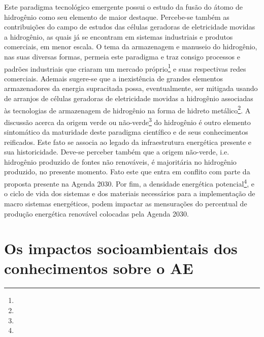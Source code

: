 \documentclass[
  12pt,       %
  openright,      %
  twoside,      %
  a4paper,      %
  english,      %
  french,       %
  spanish,      %
  brazil        %
  ]{abntex2}
\begin{document}
Este paradigma tecnológico emergente possui o estudo da fusão do átomo de hidrogênio como seu elemento de maior destaque. Percebe-se também as contribuições do campo de estudos das células geradoras de eletricidade movidas a hidrogênio, as quais já se encontram em sistemas industriais e produtos comerciais, em menor escala. O tema da armazenagem e manuseio do hidrogênio, nas suas diversas formas, permeia este paradigma e traz consigo processos e padrões industriais que criaram um mercado próprio\footnote{} e suas respectivas redes comerciais. Ademais sugere-se que a inexistência de grandes elementos armazenadores da energia supracitada possa, eventualmente, ser mitigada usando de arranjos de células geradoras de eletricidade movidas a hidrogênio associadas às tecnologias de armazenagem de hidrogênio na forma de hidreto metálico\footnote{}. A discussão acerca da origem verde ou não-verde\footnote{} do hidrogênio é outro elemento sintomático da maturidade deste paradigma científico e de seus conhecimentos reificados. Este fato se associa ao legado da infraestrutura energética presente e sua historicidade. Deve-se perceber também que a origem não-verde, i.e. hidrogênio produzido de fontes não renováveis, é majoritária no hidrogênio produzido, no presente momento. Fato este que entra em conflito com parte da proposta presente na Agenda 2030. Por fim, a densidade energética potencial\footnote{}, e o ciclo de vida dos sistemas e dos materiais necessários para a implementação de macro sistemas energéticos, podem impactar as mensurações do percentual de produção energética renovável colocadas pela Agenda 2030.




\section{Os impactos socioambientais dos conhecimentos sobre o AE}
\end{document}
